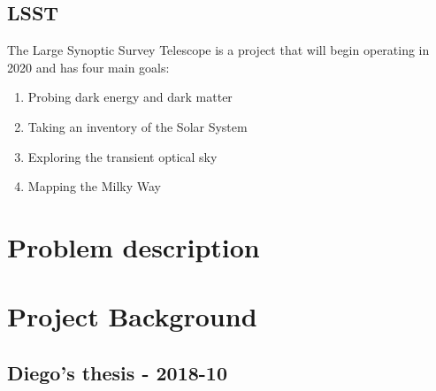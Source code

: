 \subsection{LSST}

The Large Synoptic Survey Telescope is a project that will begin operating in 2020 and has four main goals\cite{LSST}: 

\begin{enumerate}
  \item Probing dark energy and dark matter
  \item Taking an inventory of the Solar System
  \item Exploring the transient optical sky
  \item Mapping the Milky Way
\end{enumerate}

\section{Problem description}
\section{Project Background}

\subsection{Diego's thesis - 2018-10}


